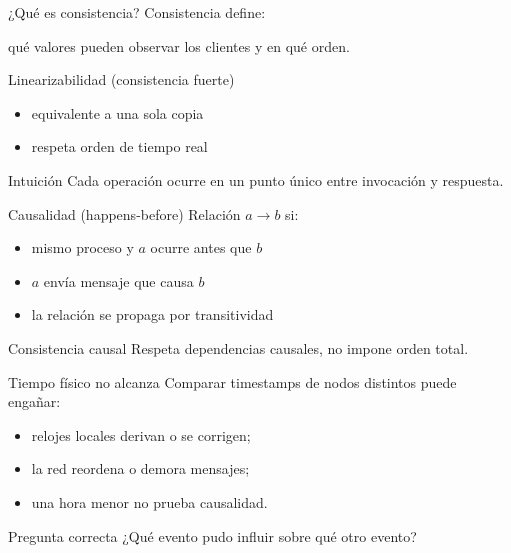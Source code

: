 \documentclass[institutional,screen,none]{ua-engineering-v6-beamer}
\begin{document}

\begin{frame}{¿Qué es consistencia?}
Consistencia define:
\begin{block}{}
qué valores pueden observar los clientes y en qué orden.
\end{block}
\end{frame}

\begin{frame}{Linearizabilidad (consistencia fuerte)}
\begin{itemize}
\item equivalente a una sola copia
\item respeta orden de tiempo real
\end{itemize}

\pause
\begin{block}{Intuición}
Cada operación ocurre en un punto único entre invocación y respuesta.
\end{block}
\end{frame}

\begin{frame}{Causalidad (happens-before)}
Relación $a \rightarrow b$ si:
\begin{itemize}
\item mismo proceso y $a$ ocurre antes que $b$
\item $a$ envía mensaje que causa $b$
\item la relación se propaga por transitividad
\end{itemize}

\pause
\begin{block}{Consistencia causal}
Respeta dependencias causales, no impone orden total.
\end{block}
\end{frame}

\begin{frame}{Tiempo físico no alcanza}
Comparar timestamps de nodos distintos puede engañar:
\begin{itemize}
\item relojes locales derivan o se corrigen;
\item la red reordena o demora mensajes;
\item una hora menor no prueba causalidad.
\end{itemize}

\pause
\begin{block}{Pregunta correcta}
¿Qué evento pudo influir sobre qué otro evento?
\end{block}
\end{frame}
\end{document}
